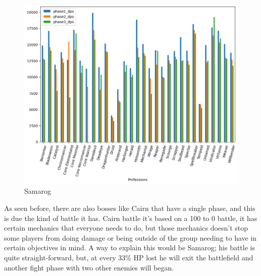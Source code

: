 \documentclass[12pt,a4paper]{article}
\begin{document}
    \begin{figure}[h!]
        
        \centering
        
        \includegraphics[width=1 \linewidth]{sam_dps_plot.png}
        \caption{Samarog}
    \end{figure}

    As seen before, there are also bosses like Cairn that have a single phase, and this is due the kind of battle
    it has. Cairn battle it's based on a 100 to 0 battle, it has certain mechanics that everyone needs to do, but
    those mechanics doesn't stop some players from doing damage or being outside of the group needing to have in 
    certain objectives in mind. A way to explain this would be Samarog; his battle is quite straight-forward, but,
    at every 33\% HP lost he will exit the battlefield and another fight phase with two other enemies will began.

    \newpage
\end{document}
